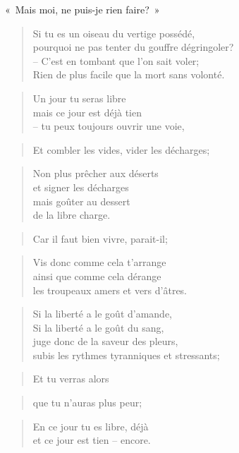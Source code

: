  \begin{center}
    «~Mais moi, ne puis-je rien faire?~»
  \end{center}
  \begin{verse}
    Si tu es un oiseau du vertige possédé,\\
    pourquoi ne pas tenter du gouffre dégringoler?\\
    -- C’est en tombant que l’on sait voler;\\
    Rien de plus facile que la mort sans volonté.
  \end{verse}
  \begin{verse}
    Un jour tu seras libre\\
    mais ce jour est déjà tien\\
    -- tu peux toujours ouvrir une voie,
  \end{verse}
  \begin{verse}
    Et combler les vides, vider les décharges;
  \end{verse}
  \begin{verse}
    Non plus prêcher aux déserts\\
    et signer les décharges\\
    mais goûter au dessert\\
    de la libre charge.
  \end{verse}
  \begin{verse}
    Car il faut bien vivre, parait-il;
  \end{verse}
  \begin{verse}
    Vis donc comme cela t’arrange\\
    ainsi que comme cela dérange\\
    les troupeaux amers et vers d’âtres.
  \end{verse}
  \begin{verse}
    Si la liberté a le goût d’amande,\\
    Si la liberté a le goût du sang,\\
    juge donc de la saveur des pleurs,\\
    subis les rythmes tyranniques et stressants;
  \end{verse}
  \begin{verse}
    Et tu verras alors
  \end{verse}
  \begin{verse}
    que tu n’auras plus peur;
  \end{verse}
  \begin{verse}
    En ce jour tu es libre, déjà\\
    et ce jour est tien -- encore.
  \end{verse}
